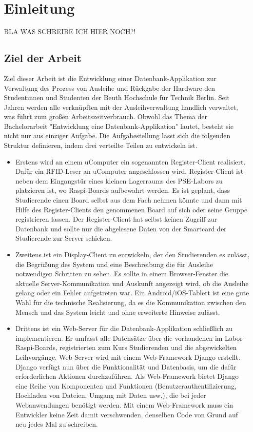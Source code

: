 \chapter{Einleitung}
\label{sec:intro}

BLA WAS SCHREIBE ICH HIER NOCH?!

\section{Ziel der Arbeit}
\label{sec:intro:goal}
Ziel dieser Arbeit ist die Entwicklung einer Datenbank-Applikation zur Verwaltung des Prozess von Ausleihe und Rückgabe der Hardware den Studentinnen und Studenten der Beuth Hochschule für Technik Berlin. Seit Jahren werden alle verknüpften mit der Ausleihverwaltung handlich verwaltet, was führt zum großen Arbeitszeitverbrauch. Obwohl das Thema der Bachelorarbeit "Entwicklung eine Datenbank-Applikation" lautet, besteht sie nicht nur aus einziger Aufgabe. Die Aufgabestellung lässt sich die folgenden Struktur definieren, indem drei verteilte Teilen zu entwickeln ist.
\begin{itemize}
\item Erstens wird an einem uComputer ein sogenannten Register-Client realisiert. Dafür ein RFID-Leser an uComputer angeschlossen wird. Register-Client ist neben dem Eingangstür eines kleinen Lagerraums des PSE-Labors zu platzieren ist, wo Raspi-Boards aufbewahrt werden. Es ist geplant, dass Studierende einen Board selbst aus dem Fach nehmen könnte und dann mit Hilfe des Register-Clients den genommenen Board auf sich oder seine Gruppe registrieren lassen. Der Register-Client hat selbst keinen Zugriff zur Datenbank und sollte nur die abgelesene Daten von der Smartcard der Studierende zur Server schicken. 
\item Zweitens ist ein Display-Client zu entwickeln, der den Studierenden es zulässt, die Begrüßung des System und eine Beschreibung die für Ausleihe notwendigen Schritten zu sehen. Es sollte in einem Browser-Fenster die aktuelle Server-Kommunikation und Auskunft angezeigt wird, ob die Ausleihe gelang oder ein Fehler aufgetreten war. Ein Android/iOS-Tablett ist eine gute Wahl für die technische Realisierung, da es die Kommunikation zwischen den Mensch und das System leicht und ohne erweiterte Hinweise zulässt. 
\item Drittens ist ein Web-Server für die Datenbank-Applikation schließlich zu implementieren. Er umfasst alle Datensätze über die vorhandenen im Labor Raspi-Boards, registrierten zum Kurs Studierenden und die abgewickelten Leihvorgänge.  Web-Server wird mit einem Web-Framework Django erstellt. Django verfügt nun über die Funktionalität und Datenbasis, um die dafür erforderlichen Aktionen durchzuführen. Als Web-Framework bietet Django eine Reihe von Komponenten und Funktionen (Benutzerauthentifizierung, Hochladen von Dateien, Umgang mit Daten usw.), die bei jeder Webanwendungen benötigt werden. Mit einem Web-Framework muss ein Entwickler keine Zeit damit verschwenden, denselben Code von Grund auf neu jedes Mal zu schreiben.
\end{itemize}

